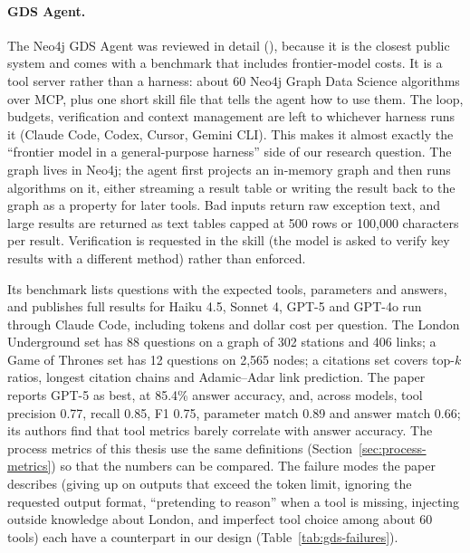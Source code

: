 \paragraph{GDS Agent.} The Neo4j GDS Agent \cite{gdsagent} was reviewed in detail (),
because it is the closest public system and comes with a benchmark that includes frontier-model costs. It is a tool
server rather than a harness: about 60 Neo4j Graph Data Science algorithms over MCP, plus one short skill file that
tells the agent how to use them. The loop, budgets, verification and context management are left to whichever
harness runs it (Claude Code, Codex, Cursor, Gemini CLI). This makes it almost exactly the ``frontier model in a
general-purpose harness'' side of our research question. The graph lives in Neo4j; the agent first projects an
in-memory graph and then runs algorithms on it, either streaming a result table or writing the result back to the
graph as a property for later tools. Bad inputs return raw exception text, and large results are returned as text
tables capped at 500 rows or 100,000 characters per result. Verification is requested in the skill (the model is
asked to verify key results with a different method) rather than enforced.

Its benchmark \cite{gdsagentbench} lists questions with the expected tools, parameters and answers, and publishes full
results for Haiku 4.5, Sonnet 4, GPT-5 and GPT-4o run through Claude Code, including tokens and dollar cost per
question. The London Underground set has 88 questions on a graph of 302 stations and 406 links; a Game of Thrones set
has 12 questions on 2,565 nodes; a citations set covers top-$k$ ratios, longest citation chains and Adamic--Adar link
prediction. The paper reports GPT-5 as best, at 85.4\% answer accuracy, and, across models, tool precision 0.77,
recall 0.85, F1 0.75, parameter match 0.89 and answer match 0.66; its authors find that tool metrics barely correlate
with answer accuracy. The process metrics of this thesis use the same definitions
(Section~\ref{sec:process-metrics}) so that the numbers can be compared. The failure modes the paper describes (giving
up on outputs that exceed the token limit, ignoring the requested output format, ``pretending to reason'' when a tool
is missing, injecting outside knowledge about London, and imperfect tool choice among about 60 tools) each have a
counterpart in our design (Table~\ref{tab:gds-failures}).

